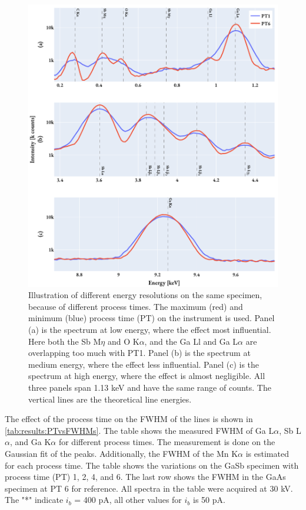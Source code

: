\begin{figure}[hptb]
    \centering
    \includegraphics[width=0.95\linewidth]{figures/results/eds_energyResolutions_process_time.pdf}
    \caption{
        Illustration of different energy resolutions on the same specimen, because of different process times.
        The maximum (red) and minimum (blue) process time (PT) on the instrument is used.
        Panel (a) is the spectrum at low energy, where the effect most influential.
        Here both the Sb M$\eta$ and O K$\alpha$, and the Ga Ll and Ga L$\alpha$ are overlapping too much with PT1.
        Panel (b) is the spectrum at medium energy, where the effect less influential.
        Panel (c) is the spectrum at high energy, where the effect is almost negligible.
        All three panels span 1.13 keV and have the same range of counts.
        The vertical lines are the theoretical line energies.
    }
    \label{fig:results:energy_resolutions_process_time}
\end{figure}


The effect of the process time on the FWHM of the lines is shown in \cref{tab:results:PTvsFWHMs}.
The table shows the measured FWHM of Ga L$\alpha$, Sb L$\alpha$, and Ga K$\alpha$ for different process times.
The measurement is done on the Gaussian fit of the peaks.
Additionally, the FWHM of the Mn K$\alpha$ is estimated for each process time.
The table shows the variations on the GaSb specimen with process time (PT) 1, 2, 4, and 6.
The last row shows the FWHM in the GaAs specimen at PT 6 for reference.
All spectra in the table were acquired at 30 kV.
The "*" indicate $i_b$ = 400 pA, all other values for $i_b$ is 50 pA.



